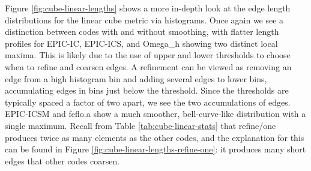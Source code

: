 \documentclass[3p,times,procedia,number]{elsarticle}
\begin{document}
Figure \ref{fig:cube-linear-lengths} shows a more in-depth look
at the edge length distributions for the linear cube metric
via histograms.
Once again we see a distinction between codes with and without
smoothing, with flatter length profiles
for EPIC-IC, EPIC-ICS, and Omega\_h showing two distinct local maxima.
This is likely due to the use of upper and lower thresholds
to choose when to refine and coarsen edges.
A refinement can be viewed as removing an edge from a high
histogram bin and adding several edges to lower bins,
accumulating edges in bins just below the threshold.
Since the thresholds are typically spaced a factor of two apart,
we see the two accumulations of edges.
EPIC-ICSM and feflo.a show a much smoother, bell-curve-like distribution
with a single maximum.
Recall from Table \ref{tab:cube-linear-stats} that refine/one produces
twice as many elements as the other codes, and the explanation for this can be
found in Figure \ref{fig:cube-linear-lengths-refine-one}:
it produces many short edges that other codes coarsen.
\end{document}
